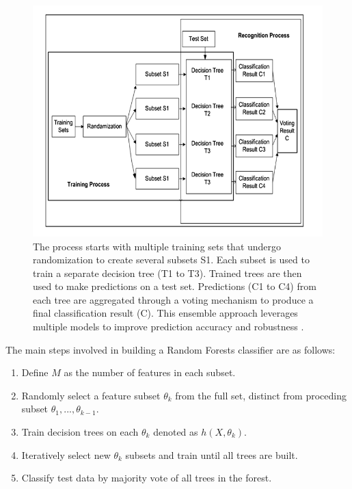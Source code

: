            \begin{figure}[H]
            \centering
            \includegraphics[width=.7\textwidth]{../src/resources/images/models/rf_image.png}
            \caption{
                The process starts with multiple training sets that undergo randomization to create several subsets S1. Each subset is used to train a separate decision tree (T1 to T3). Trained trees are then used to make predictions on a test set. Predictions (C1 to C4) from each tree are aggregated through a voting mechanism to produce a final classification result (C). This ensemble approach leverages multiple models to improve prediction accuracy and robustness \cite{parmar_review_2019}.
            }
            \label{fig:random_forest}
            \end{figure}

            The main steps involved in building a Random Forests classifier are as follows:
           
            \begin{enumerate}
                \item Define $M$ as the number of features in each subset.
                \item Randomly select a feature subset $\theta_k$ from the full set, distinct from proceding subset $\theta_{1},..., \theta_{k-1}$.
                \item Train decision trees on each $\theta_k$ denoted as $h(X, \theta_k)$.
                \item Iteratively select new $\theta_k$ subsets and train until all trees are built.
                \item Classify test data by majority vote of all trees in the forest.
            \end{enumerate}

